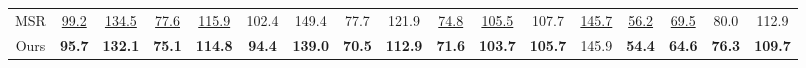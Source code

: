 \begin{table}[h]
{\begin{tabular}{c|cc|cc|cc|cc|cc|cc|cc|cc}
        MSR   & \underline{99.2}          & \underline{134.5}          & \underline{77.6}          & \underline{115.9}          & 102.4          & 149.4          & 77.7           & 121.9          & \underline{74.8}          & \underline{105.5}          & 107.7          & \underline{145.7}          & \underline{56.2}             & \underline{69.5}             & 80.0           & 112.9          \\
        Ours   & \textbf{95.7} & \textbf{132.1} & \textbf{75.1} & \textbf{114.8} & \textbf{94.4}  & \textbf{139.0} & \textbf{70.5}  & \textbf{112.9} & \textbf{71.6} & \textbf{103.7} & \textbf{105.7} & 145.9          & \textbf{54.4}    & \textbf{64.6}    & \textbf{76.3}  & \textbf{109.7} \\ \hline
        \end{tabular}
        }
        
        \label{table:human3.6_longterm_256}
        \end{table}


